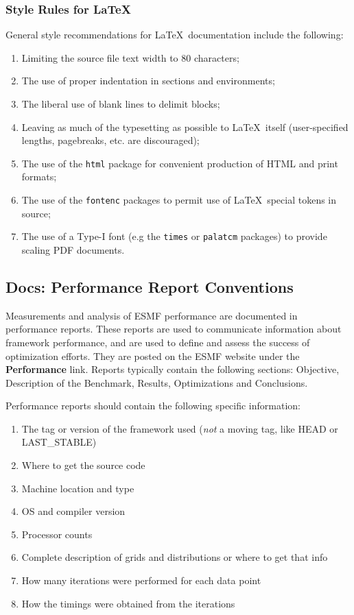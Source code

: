 

\subsubsection{Style Rules for \LaTeX}

General style recommendations for \LaTeX\ documentation include the
following:

\begin{enumerate}
\item Limiting the source file text width to 80 characters;
\item The use of proper indentation in sections and environments;
\item The liberal use of blank lines to delimit blocks;
\item Leaving as much of the typesetting as possible to \LaTeX\ itself
  (user-specified lengths, pagebreaks, etc. are discouraged);
\item The use of the \texttt{html} package for convenient production
  of HTML and print formats;
\item The use of the \texttt{fontenc} packages
  to permit use of \LaTeX\ special tokens in source;
\item The use of a Type-I font (e.g the \texttt{times} or
  \texttt{palatcm} packages) to provide scaling PDF documents.
\end{enumerate}

\subsection{Docs: Performance Report Conventions}
Measurements and analysis of ESMF performance are documented in
performance reports.  These reports are used to communicate 
information about framework performance, and are used to
define and assess the success of optimization efforts.
They are posted on the ESMF website under the {\bf Performance}
link.  Reports typically contain the following sections:  Objective,
Description of the Benchmark,  Results, Optimizations 
and Conclusions.

Performance reports should contain the following specific 
information:
\begin{enumerate}
\item The tag or version of the framework used ({\it not} a moving tag,
like HEAD or LAST\_STABLE)
\item Where to get the source code
\item Machine location and type
\item OS and compiler version
\item Processor counts
\item Complete description of grids and distributions or where
to get that info
\item How many iterations were performed for each data point
\item How the timings were obtained from the iterations 
\end{enumerate}

